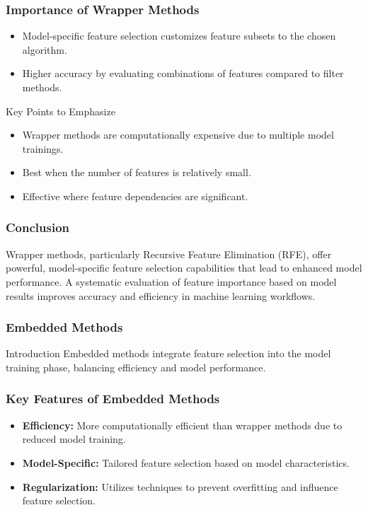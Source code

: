 \documentclass[aspectratio=169]{beamer}
\begin{document}
\begin{frame}[fragile]
    \frametitle{Importance of Wrapper Methods}
    \begin{itemize}
        \item Model-specific feature selection customizes feature subsets to the chosen algorithm.
        \item Higher accuracy by evaluating combinations of features compared to filter methods.
    \end{itemize}
    \begin{block}{Key Points to Emphasize}
        \begin{itemize}
            \item Wrapper methods are computationally expensive due to multiple model trainings.
            \item Best when the number of features is relatively small.
            \item Effective where feature dependencies are significant.
        \end{itemize}
    \end{block}
\end{frame}

\begin{frame}[fragile]
    \frametitle{Conclusion}
    Wrapper methods, particularly Recursive Feature Elimination (RFE), offer powerful, model-specific feature selection capabilities that lead to enhanced model performance. A systematic evaluation of feature importance based on model results improves accuracy and efficiency in machine learning workflows.
\end{frame}

\begin{frame}[fragile]
    \frametitle{Embedded Methods}
    \begin{block}{Introduction}
        Embedded methods integrate feature selection into the model training phase, balancing efficiency and model performance.
    \end{block}
\end{frame}

\begin{frame}[fragile]
    \frametitle{Key Features of Embedded Methods}
    \begin{itemize}
        \item \textbf{Efficiency:} More computationally efficient than wrapper methods due to reduced model training.
        \item \textbf{Model-Specific:} Tailored feature selection based on model characteristics.
        \item \textbf{Regularization:} Utilizes techniques to prevent overfitting and influence feature selection.
    \end{itemize}
\end{frame}
\end{document}
